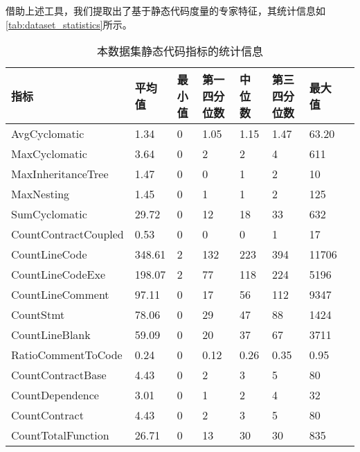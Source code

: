 借助上述工具，我们提取出了基于静态代码度量的专家特征，其统计信息如\autoref{tab:dataset_statistics}所示。
\begin{table}[htbp]
    \caption{\label{tab:dataset_statistics}本数据集静态代码指标的统计信息}
    \small
    \renewcommand{\arraystretch}{1.3}
    \begin{tabularx}{\linewidth}
        {p{3cm}<{\centering}X<{\centering}p{1.5cm}<{\centering}X<{\centering}X<{\centering}X<{\centering}X<{\centering}X<{\centering}}
    \hline
    \textbf{指标}                    & \textbf{平均值}   & \textbf{最小值} & \textbf{第一四分位数} & \textbf{中位数}  & \textbf{第三四分位数} & \textbf{最大值}   \\ \hline
    AvgCyclomatic         & 1.34        & 0   & 1.05   & 1.15 & 1.47   & 63.20 \\
    MaxCyclomatic         & 3.64        & 0   & 2      & 2    & 4      & 611   \\
    MaxInheritanceTree    & 1.47        & 0   & 0      & 1    & 2      & 10    \\
    MaxNesting            & 1.45        & 0   & 1      & 1    & 2      & 125   \\
    SumCyclomatic         & 29.72      & 0   & 12     & 18   & 33     & 632   \\
    CountContractCoupled  & 0.53        & 0   & 0      & 0    & 1      & 17    \\ \hline
    CountLineCode         & 348.61    & 2   & 132    & 223  & 394    & 11706 \\
    CountLineCodeExe      & 198.07    & 2   & 77     & 118  & 224    & 5196  \\
    CountLineComment      & 97.11     & 0   & 17     & 56   & 112    & 9347  \\
    CountStmt             & 78.06      & 0   & 29     & 47   & 88     & 1424  \\
    CountLineBlank        & 59.09      & 0   & 20     & 37   & 67     & 3711  \\
    RatioCommentToCode    & 0.24        & 0   & 0.12   & 0.26 & 0.35   & 0.95  \\ \hline
    CountContractBase     & 4.43        & 0   & 2      & 3    & 5      & 80    \\
    CountDependence       & 3.01        & 0   & 1      & 2    & 4      & 32    \\
    CountContract         & 4.43        & 0   & 2      & 3    & 5      & 80    \\
    CountTotalFunction    & 26.71      & 0   & 13     & 30   & 30     & 835   \\

\end{tabularx}
\end{table}
